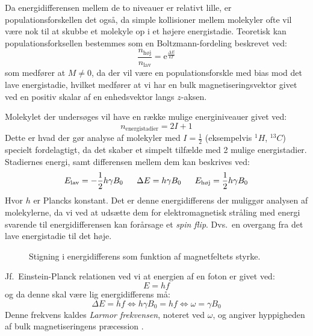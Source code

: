     Da energidifferensen mellem de to niveauer er relativt lille, er populationsforskellen det også, da simple kollisioner mellem molekyler ofte vil være nok til at skubbe et molekyle op i et højere energistadie. Teoretisk kan populationsforksellen bestemmes som en Boltzmann-fordeling beskrevet ved:
    \[
        \frac{n_{\text{høj}}}{n_{\text{lav}}}=\mathrm{e}^{\frac{\Delta E}{kT}}
    \]
    som medfører at $M \neq 0$, da der vil være en populationsforskle med bias mod det lave energistadie, hvilket medfører at vi har en bulk magnetiseringsvektor givet ved en positiv skalar af en enhedsvektor langs $z$-aksen.

    Molekylet der undersøges vil have en række mulige energiniveauer givet ved:
    \[
        n_{\text{energistadier}}=2I+1
    \]
    Dette er hvad der gør analyse af molekyler med $I=\frac{1}{2}$ (eksempelvis $^1H$, $^{13}C$) specielt fordelagtigt, da det skaber et simpelt tilfælde med 2 mulige energistadier. Stadiernes energi, samt differensen mellem dem kan beskrives ved:
    \[
        E_{\text{lav}}=-\frac{1}{2}h\gamma B_0 \hskip 16pt \Delta E=h\gamma B_0 \hskip 16pt E_{\text{høj}}=\frac{1}{2}h\gamma B_0
    \]
    Hvor $h$ er Plancks konstant. Det er denne energidifferens der muliggør analysen af molekylerne, da vi ved at udsætte dem for elektromagnetisk stråling med energi svarende til energidifferensen kan forårsage et \textit{spin flip}. Dvs.\ en overgang fra det lave energistadie til det høje. 
    \begin{figure}[H]\centering
        \caption{Stigning i energidifferens som funktion af magnetfeltets styrke.}
    \end{figure}
    Jf.\ Einstein-Planck relationen ved vi at energien af en foton er givet ved:
    \[
        E=hf
    \]
    og da denne skal være lig energidifferens må:
    \[
        \Delta E=hf \Leftrightarrow h\gamma B_0 =hf \Leftrightarrow \omega=\gamma B_0 
    \]
    Denne frekvens kaldes \textit{Larmor frekvensen}, noteret ved $\omega$, og angiver hyppigheden af bulk magnetiseringens præcession \parencite{Derr1,Derr2}.


